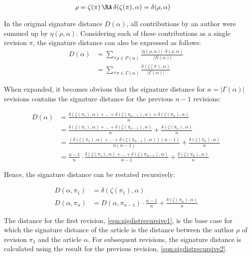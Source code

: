 \begin{align*}
\rho &= \zeta(\pi) \, \RA \,   \delta(\zeta(\pi),\alpha) = \delta(\rho,\alpha) 
\end{align*}

In the original signature distance $D(\alpha)$, all contributions by an author were summed up by $\eta(\rho,\alpha)$.
Considering each of these contributions as a single revision $\pi$, the signature distance can also be  expressed as follows:
\begin{align*}
D(\alpha) &= \sum_{\forall \rho \in P(\alpha)} \frac{|\eta(\rho,\alpha)| \cdot \delta(\rho,\alpha)}{|N(\alpha)|} \\
 &=  \sum_{\forall \pi \in \Gamma(\alpha)} \frac{\delta(\zeta(\pi),\alpha)}{|\Gamma(\alpha)|}
 \end{align*}

When expanded, it becomes obvious that the signature distance for $n = |\Gamma(\alpha)|$ revisions contains the signature distance for the previous $n-1$ revisions:
 
\begin{align*}
D(\alpha) &=  \frac{\delta(\zeta(\pi_{1}),\alpha)  + \ldots + \delta(\zeta(\pi_{n-1}),\alpha) + \delta(\zeta(\pi_{n}),\alpha)}{n} \\
 &=  \frac{\delta(\zeta(\pi_{1}),\alpha)  + \ldots + \delta(\zeta(\pi_{n-1}),\alpha)}{n} + \frac{\delta(\zeta(\pi_{n}),\alpha)}{n} \\
 &=  \frac{(\delta(\zeta(\pi_{1}),\alpha)  + \ldots + \delta(\zeta(\pi_{n-1}),\alpha))(n-1)}{n(n-1)} + \frac{\delta(\zeta(\pi_{n}),\alpha)}{n} \\
 &=  \frac{n-1}{n} \cdot \frac{\delta(\zeta(\pi_{1}),\alpha)  + \ldots + \delta(\zeta(\pi_{n-1}),\alpha)}{n-1} + \frac{\delta(\zeta(\pi_{n}),\alpha)}{n} 
\end{align*}

Hence, the signature distance can be restated recursively:

\begin{align}
D(\alpha, \pi_{1}) &= \delta(\zeta(\pi_{1}),\alpha)\label{eqn:sigdistrecursive1}\\
D(\alpha, \pi_{n}) &=  D(\alpha, \pi_{n-1}) \cdot \frac{n-1}{n} + \frac{\delta(\zeta(\pi_{n}),\alpha)}{n} \label{eqn:sigdistrecursive2}
\end{align}

The distance for the first revision, \ref{eqn:sigdistrecursive1}, is the base case for which the signature distance of the article is the distance between the author $\rho$ of revision $\pi_{1}$ and the article $\alpha$.
For subsequent revisions, the signature distance is calculated using the result for the previous revision, \ref{eqn:sigdistrecursive2}.


